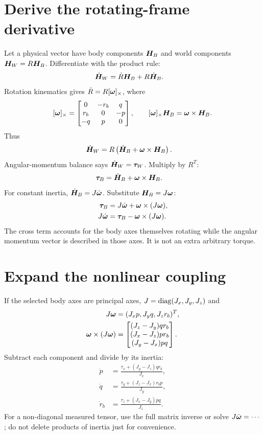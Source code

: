 \section{Derive the rotating-frame derivative}
Let a physical vector have body components $\bm{H}_B$ and world components
$\bm{H}_W=R\bm{H}_B$. Differentiate with the product rule:
\begin{align}
\dot{\bm{H}}_W&=\dot R\bm{H}_B+R\dot{\bm{H}}_B.
\end{align}
Rotation kinematics gives $\dot R=R[\bm{\omega}]_\times$, where
\begin{equation}
[\bm{\omega}]_\times=
\begin{bmatrix}0&-r_b&q\\r_b&0&-p\\-q&p&0\end{bmatrix},
\qquad [\bm{\omega}]_\times\bm{H}_B=\bm{\omega}\times\bm{H}_B.
\end{equation}
Thus
\begin{align}
\dot{\bm{H}}_W
&=R\left(\dot{\bm{H}}_B+\bm{\omega}\times\bm{H}_B\right).
\end{align}
Angular-momentum balance says $\dot{\bm{H}}_W=\bm{\tau}_W$.
Multiply by $R^T$:
\begin{align}
\bm{\tau}_B&=\dot{\bm{H}}_B+\bm{\omega}\times\bm{H}_B.
\end{align}
For constant inertia, $\dot{\bm{H}}_B=J\dot{\bm{\omega}}$. Substitute
$\bm{H}_B=J\bm{\omega}$:
\begin{align}
\bm{\tau}_B&=J\dot{\bm{\omega}}+\bm{\omega}\times(J\bm{\omega}),\\
J\dot{\bm{\omega}}
&=\bm{\tau}_B-\bm{\omega}\times(J\bm{\omega}).
\end{align}
The cross term accounts for the body axes themselves rotating while the angular
momentum vector is described in those axes. It is not an extra arbitrary torque.

\section{Expand the nonlinear coupling}
If the selected body axes are principal axes,
$J=\operatorname{diag}(J_x,J_y,J_z)$ and
\begin{align}
J\bm{\omega}&=(J_xp,J_yq,J_zr_b)^T,\\
\bm{\omega}\times(J\bm{\omega})
&=\begin{bmatrix}
(J_z-J_y)qr_b\\(J_x-J_z)pr_b\\(J_y-J_x)pq
\end{bmatrix}.
\end{align}
Subtract each component and divide by its inertia:
\begin{align}
\dot p&=\frac{\tau_x+(J_y-J_z)qr_b}{J_x},\\
\dot q&=\frac{\tau_y+(J_z-J_x)r_bp}{J_y},\\
\dot r_b&=\frac{\tau_z+(J_x-J_y)pq}{J_z}.
\end{align}
For a non-diagonal measured tensor, use the full matrix inverse or solve
$J\dot{\bm{\omega}}=\cdots$; do not delete products of inertia just for convenience.

